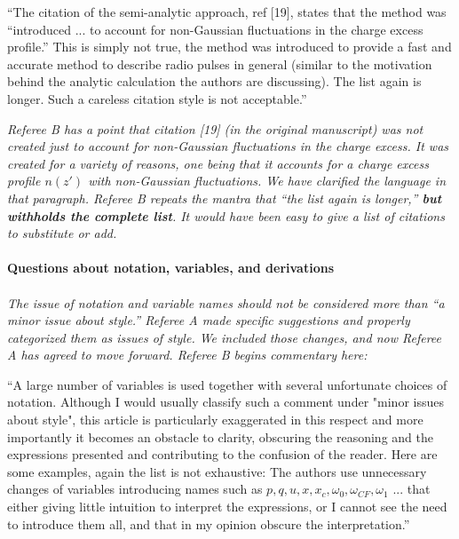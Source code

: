 \documentclass[12pt]{article}
\begin{document}
``The citation of the semi-analytic approach, ref [19], states that the method was ``introduced ... to account for non-Gaussian fluctuations in the charge excess profile.''  This is simply not true, the method was introduced to provide a fast and accurate method to describe radio pulses in general (similar to the motivation behind the analytic calculation the authors are discussing). The list again is longer. Such a careless citation style is not acceptable.''

\textit{Referee B has a point that citation [19] (in the original manuscript) was not created just to account for non-Gaussian fluctuations in the charge excess.  It was created for a variety of reasons, one being that it accounts for a charge excess profile $n(z')$ with non-Gaussian fluctuations.  We have clarified the language in that paragraph.  Referee B repeats the mantra that ``the list again is longer,'' \textbf{but withholds the complete list}.  It would have been easy to give a list of citations to substitute or add.} \\ \\

\textbf{Questions about notation, variables, and derivations} \\ \\

\textit{The issue of notation and variable names should not be considered more than ``a minor issue about style.'' Referee A made specific suggestions and properly categorized them as issues of style.  We included those changes, and now Referee A has agreed to move forward.  Referee B begins commentary here:}

``A large number of variables is used together with several unfortunate choices of notation. Although I would usually classify such a comment under "minor issues about style", this article is particularly exaggerated in this respect and more importantly it becomes an obstacle to clarity, obscuring the reasoning and the expressions presented and contributing to the confusion of the reader. Here are some examples, again the list is not exhaustive: The authors use unnecessary changes of variables introducing names such as $p,q,u, x, x_{c}, \omega_{0}, \omega_{CF}, \omega_1$ ... that either giving little intuition to interpret the expressions, or I cannot see the need to introduce them all, and that in my opinion obscure the interpretation.''
\end{document}
